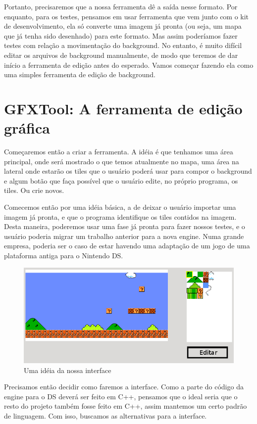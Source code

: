 \documentclass[brazil]{abnt}
\begin{document}
Portanto, precisaremos que a nossa ferramenta dê a saída nesse formato. Por enquanto, para os testes, pensamos em usar ferramenta que vem junto com o kit de desenvolvimento, ela só converte uma imagem já pronta (ou seja, um mapa que já tenha sido desenhado) para este formato. Mas assim poderíamos fazer testes com relação a movimentação do background. No entanto, é muito difícil editar os arquivos de background manualmente, de modo que teremos de dar início a ferramenta de edição antes do esperado. Vamos começar fazendo ela como uma simples ferramenta de edição de background.

\section{GFXTool: A ferramenta de edição gráfica}
Começaremos então a criar a ferramenta. A idéia é que tenhamos uma área principal, onde será mostrado o que temos atualmente no mapa, uma área na lateral onde estarão os tiles que o usuário poderá usar para compor o background e algum botão que faça possível que o usuário edite, no próprio programa, os tiles. Ou crie novos.

Comecemos então por uma idéia básica, a de deixar o usuário importar uma imagem já pronta, e que o programa identifique os tiles contidos na imagem. Desta maneira, poderemos usar uma fase já pronta para fazer nossos testes, e o usuário poderia migrar um trabalho anterior para a nova engine. Numa grande empresa, poderia ser o caso de estar havendo uma adaptação de um jogo de uma plataforma antiga para o Nintendo DS.

\begin{figure}[h]
\includegraphics[width=\linewidth]{imgs/mockup.png}
\caption{Uma idéia da nossa interface} 
\end{figure}

Precisamos então decidir como faremos a interface. Como a parte do código da engine para o DS deverá ser feito em C++, pensamos que o ideal seria que o resto do projeto também fosse feito em C++, assim mantemos um certo padrão de linguagem. Com isso, buscamos as alternativas para a interface.
\end{document}
